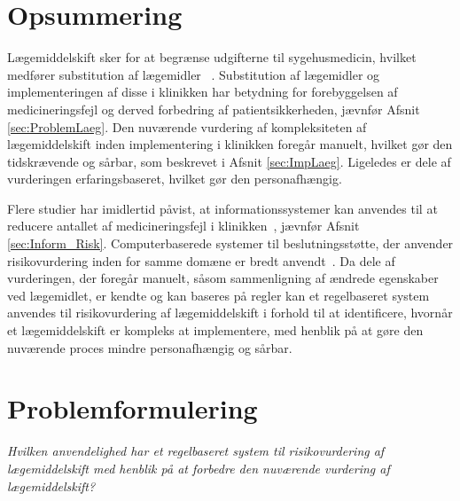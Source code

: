 \section{Opsummering}
Lægemiddelskift sker for at begrænse udgifterne til sygehusmedicin, hvilket medfører substitution af lægemidler ~\citep{Ess2003, Johnston2011}. Substitution af lægemidler og implementeringen af disse i klinikken har betydning for forebyggelsen af medicineringsfejl og derved forbedring af patientsikkerheden, jævnfør Afsnit \ref{sec:ProblemLaeg}. Den nuværende vurdering af kompleksiteten af lægemiddelskift inden implementering i klinikken foregår manuelt, hvilket gør den tidskrævende og sårbar, som beskrevet i Afsnit \ref{sec:ImpLaeg}. Ligeledes er dele af vurderingen erfaringsbaseret, hvilket gør den personafhængig.

Flere studier har imidlertid påvist, at informationssystemer kan anvendes til at reducere antallet af medicineringsfejl i klinikken~\citep{Agrawal2009, Stenner2010, Fischer2008, Simpson2008}, jævnfør Afsnit \ref{sec:Inform_Risk}. Computerbaserede systemer til beslutningsstøtte, der anvender risikovurdering inden for samme domæne er bredt anvendt~\citep{Geissert2018, Rawshani2018}. Da dele af vurderingen, der foregår manuelt, såsom sammenligning af ændrede egenskaber ved lægemidlet, er kendte og kan baseres på regler kan et regelbaseret system anvendes til risikovurdering af lægemiddelskift i forhold til at identificere, hvornår et lægemiddelskift er kompleks at implementere, med henblik på at gøre den nuværende proces mindre personafhængig og sårbar. 

\section{Problemformulering}
\textit{Hvilken anvendelighed har et regelbaseret system til risikovurdering af lægemiddelskift med henblik på at forbedre den nuværende vurdering af lægemiddelskift?}


